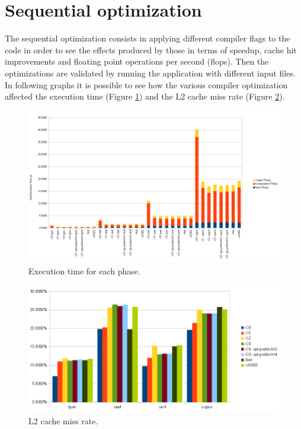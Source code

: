 \documentclass[12pt, a4paper]{article}
\begin{document}
\clearpage

\section{Sequential optimization}
The sequential optimization consists in applying different compiler flags to
the code in order to see the effects produced by those in terms of speedup,
cache hit improvements and floating point operations per second (flops).
Then the optimizations are validated by running the application with different
input files.
In following graphs it is possible to see how the various compiler optimization
affected the execution time (Figure \ref{fig:exec_time}) and the L2 cache miss 
rate (Figure \ref{fig:cache_misses}).
\begin{figure}[h]
  \begin{centering}
    \includegraphics[width=1\textwidth]{figures/exec_time.png}
    \par\end{centering}
  \caption{Execution time for each phase. \label{fig:exec_time}}
\end{figure}

\begin{figure}[h]
  \begin{centering}
    \includegraphics[width=1\textwidth]{figures/cache.png}
    \par\end{centering}
  \caption{L2 cache miss rate. \label{fig:cache_misses}}
\end{figure}
\end{document}
